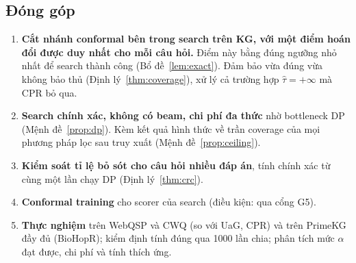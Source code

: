 \documentclass[11pt,a4paper]{article}
\theoremstyle{remark}
\newcommand{\tauhat}{\hat{\tau}}
\begin{document}
\subsection{Đóng góp}
\begin{enumerate}[nosep]
  \item \textbf{Cắt nhánh conformal bên trong search trên KG, với một điểm hoán đổi được duy nhất cho mỗi câu hỏi.} Điểm này bằng đúng ngưỡng nhỏ nhất để search thành công (Bổ đề~\ref{lem:exact}). Đảm bảo vừa đúng vừa không bảo thủ (Định lý~\ref{thm:coverage}), xử lý cả trường hợp $\tauhat=+\infty$ mà CPR bỏ qua.
  \item \textbf{Search chính xác, không có beam, chi phí đa thức} nhờ bottleneck DP (Mệnh đề~\ref{prop:dp}). Kèm kết quả hình thức về trần coverage của mọi phương pháp lọc sau truy xuất (Mệnh đề~\ref{prop:ceiling}).
  \item \textbf{Kiểm soát tỉ lệ bỏ sót cho câu hỏi nhiều đáp án}, tính chính xác từ cùng một lần chạy DP (Định lý~\ref{thm:crc}).
  \item \textbf{Conformal training} cho scorer của search (điều kiện: qua cổng G5).
  \item \textbf{Thực nghiệm} trên WebQSP và CWQ (so với UaG, CPR) và trên PrimeKG đầy đủ (BioHopR); kiểm định tính đúng qua 1000 lần chia; phân tích mức $\alpha$ đạt được, chi phí và tính thích ứng.
\end{enumerate}
\end{document}
